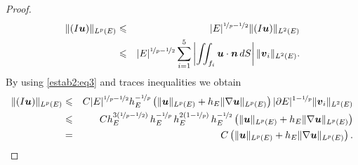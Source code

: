 \begin{proof}
\begin{eqnarray*}
\|(I\boldsymbol{u})\|_{L^p(E)}
&\leqslant& |E|^{{\nicefrac1p}-{\nicefrac12}}\|(I\boldsymbol{u})\|_{L^2(E)}\\
&\leqslant& |E|^{{\nicefrac1p}-{\nicefrac12}} \sum_{i=1}^5 
  \left|\iint_{f_i}\boldsymbol{u}\cdot\boldsymbol{n}\,dS\right|\|\boldsymbol{v}_i\|_{L^2(E)}.
\end{eqnarray*}
By using \eqref{estab2:eq3} and traces inequalities %
we obtain
\begin{eqnarray*}
\|(I\boldsymbol{u})\|_{L^p(E)} &\leqslant& C |E|^{{\nicefrac1p}-{\nicefrac12}} 
  h_E^{-{\nicefrac1p}}\left(\|\boldsymbol{u}\|_{L^p(E)}+h_E\|\nabla\boldsymbol{u}\|_{L^p(E)}\right)|\partial E|^{1-{\nicefrac1p}} \|\boldsymbol{v}_i\|_{L^2(E)}\\
&\leqslant& C h_E^{3\left({\nicefrac1p}-{\nicefrac12}\right)}\,h_E^{-{\nicefrac1p}}\,
  h_E^{2\left(1-{\nicefrac1p}\right)}\,h_E^{-{\nicefrac12}}
    \left(\|\boldsymbol{u}\|_{L^p(E)} + h_E\|\nabla\boldsymbol{u}\|_{L^p(E)}\right)\\
& = & C \left(\|\boldsymbol{u}\|_{L^p(E)} + h_E\|\nabla\boldsymbol{u}\|_{L^p(E)}\right).
\end{eqnarray*}



\end{proof}

